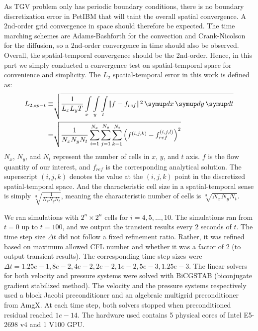 As TGV problem only has periodic boundary conditions, there is no boundary discretization error in PetIBM that will taint the overall spatial convergence.
A 2nd-order grid convergence in space should therefore be expected.
The time marching schemes are Adams-Bashforth for the convection and Crank-Nicolson for the diffusion, so a 2nd-order convergence in time should also be observed.
Overall, the spatial-temporal convergence should be the 2nd-order.
Hence, in this part we simply conducted a convergence test on spatial-temporal space for  convenience and simplicity.
The $L_2$ spatial-temporal error in this work is defined as:
\begin{equation}\label{eq:spt-err-def}
    \begin{aligned}
    L_{2,sp-t} \equiv &\sqrt{
        \frac{1}{L_x L_y T}
        \int\limits_{x} \int\limits_{y} \int\limits_{t} \lVert f - f_{ref} \rVert^2 \diff x \diff y \diff t
    } \\
    = &
    \sqrt{\frac{1}{N_x N_y N_t}\sum\limits_{i=1}^{N_x}\sum\limits_{j=1}^{N_y}\sum\limits_{k=1}^{N_t}\left(f^{(i, j, k)} - f_{ref}^{(i, j, l)}\right)^2}
    \end{aligned}
\end{equation}
$N_x$, $N_y$, and $N_t$ represent the number of cells in $x$, $y$, and $t$ axis.
$f$ is the flow quantity of our interest, and $f_{ref}$ is the corresponding analytical solution.
The superscript $(i, j, k)$ denotes the value at the $(i, j, k)$ point in the discretized spatial-temporal space.
And the characteristic cell size in a spatial-temporal sense is simply $\sqrt[3]{\frac{1}{N_x N_y N_t}}$, meaning the characteristic number of cells is $\sqrt[3]{N_x N_y N_t}$.

We ran simulations with $2^{n} \times 2^{n}$ cells for $i=4, 5, \dots, 10$.
The simulations ran from $t=0$ up to $t=100$, and we output the transient results every $2$ seconds of $t$.
The time step size $\Delta t$ did not follow a fixed refinement ratio.
Rather, it was refined based on maximum allowed CFL number and whether it was a factor of $2$ (to output transient results).
The corresponding time step sizes were $\Delta t = 1.25e-1, 8e-2, 4e-2, 2e-2, 1e-2, 5e-3, 1.25e-3$.
The linear solvers for both velocity and pressure systems were solved with BiCGSTAB (biconjugate gradient stabilized method).
The velocity and the pressure systems respectively used a block Jacobi preconditioner and an algebraic multigrid preconditioner from AmgX.
At each time step, both solvers stopped when preconditioned residual reached $1e-14$.
The hardware used contains 5 physical cores of Intel E5-2698 v4 and 1 V100 GPU.

